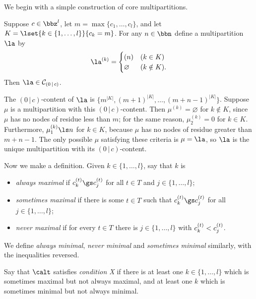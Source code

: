 \documentclass[a4paper, 11pt, twoside]{article}
\begin{document}
We begin with a simple construction of core multipartitions.

\begin{lemma}\label{xcore}
Suppose $c\in\bbz^l$, let $m=\max\{c_1,\dots,c_l\}$, and let $K=\lset{k\in\{1,\dots,l\}}{c_k=m}$. For any $n\in\bbn$ define a multipartition $\la$ by
\[
\la^{(k)}=
\begin{cases}
(n)&(k\in K)\\
\varnothing&(k\notin K).
\end{cases}
\]
Then $\la\in\mc0c$.
\end{lemma}

\begin{pf}
The $(0\,|\,c)$-content of $\la$ is $\{m^{|K|},(m+1)^{|K|},\dots,(m+n-1)^{|K|}\}$. Suppose $\mu$ is a multipartition with this $(0\,|\,c)$-content. Then $\mu^{(k)}=\varnothing$ for $k\notin K$, since $\mu$ has no nodes of residue less than $m$; for the same reason, $\mu^{(k)}_2=0$ for $k\in K$. Furthermore, $\mu^{(k)}_1\ls n$ for $k\in K$, because $\mu$ has no nodes of residue greater than $m+n-1$. The only possible $\mu$ satisfying these criteria is $\mu=\la$, so $\la$ is the unique multipartition with its $(0\,|\,c)$-content.
\end{pf}

Now we make a definition. Given $k\in\{1,\dots,l\}$, say that $k$ is
\begin{itemize}
\item
\emph{always maximal} if $\sof ct_k\gs\sof ct_j$ for all $t\in T$ and $j\in\{1,\dots,l\}$;
\item
\emph{sometimes maximal} if there is some $t\in T$ such that $\sof ct_k\gs\sof ct_j$ for all $j\in\{1,\dots,l\}$;
\item
\emph{never maximal} if for every $t\in T$ there is $j\in\{1,\dots,l\}$ with $c^{(t)}_k<c^{(t)}_j$.
\end{itemize}
We define \emph{always minimal}, \emph{never minimal} and \emph{sometimes minimal} similarly, with the inequalities reversed.

Say that $\calt$ satisfies \emph{condition X} if there is at least one $k\in\{1,\dots,l\}$ which is sometimes maximal but not always maximal, and at least one $k$ which is sometimes minimal but not always minimal.
\begin{comment}are $t,u,v,w\in T$ and $1\ls j,k\ls l$ such that
\begin{alignat*}4
\sof ct_j&\gs \sof ct_m&&\text{ for all }1\ls m\ls l,&\qquad \sof cu_j&<\sof cu_m&&\text{ for some }1\ls m\ls l,
\\
\sof cv_k&\ls \sof cv_m&&\text{ for all }1\ls m\ls l,&\qquad \sof cw_k&>\sof cw_m&&\text{ for some }1\ls m\ls l.
\end{alignat*}
Another way of saying this is: the set of elements of $\{1,\dots,l\}$ on which $\sof ct$ attains its maximum is not the same for all $t\in T$, and the set of elements of $\{1,\dots,l\}$ on which $\sof ct$ attains its minimum is not the same for all $t\in T$.
\end{comment}
\end{document}
